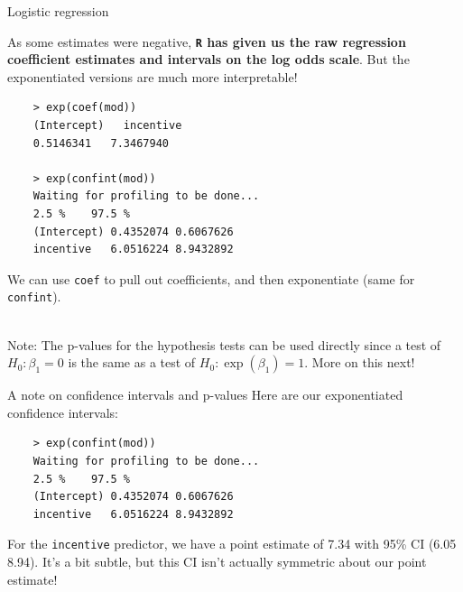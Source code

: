\documentclass[10pt,t]{beamer}
\begin{document}
\begin{frame}[fragile]{Logistic regression}
	\vspace{-5 mm}
	
	As some estimates were negative, \textbf{\texttt{R} has given us the raw regression coefficient estimates and intervals on the log odds scale}. But the exponentiated versions are much more interpretable!
	\medskip
	\small
	\begin{verbatim}
	> exp(coef(mod))
	(Intercept)   incentive 
	0.5146341   7.3467940 
	
	> exp(confint(mod))
	Waiting for profiling to be done...
	2.5 %    97.5 %
	(Intercept) 0.4352074 0.6067626
	incentive   6.0516224 8.9432892
	\end{verbatim}
	\normalsize
	
	\medskip
	We can use \texttt{coef} to pull out coefficients, and then exponentiate (same for \texttt{confint}). 
	\\ ~\ 
	
	Note: The p-values for the hypothesis tests can be used directly since a test of $H_0: \beta_1 = 0$ is the same as a test of $H_0: \exp(\beta_1) = 1$. More on this next!
\end{frame}

\begin{frame}[fragile]{A note on confidence intervals and p-values}
	\vspace{-0.7cm}
	Here are our exponentiated confidence intervals:
	
		\begin{verbatim}
	> exp(confint(mod))
	Waiting for profiling to be done...
	2.5 %    97.5 %
	(Intercept) 0.4352074 0.6067626
	incentive   6.0516224 8.9432892
	\end{verbatim}
	For the \texttt{incentive} predictor, we have a point estimate of 7.34 with 95\% CI (6.05 8.94). It's a bit subtle, but this CI isn't actually symmetric about our point estimate!

\end{frame}
\end{document}
